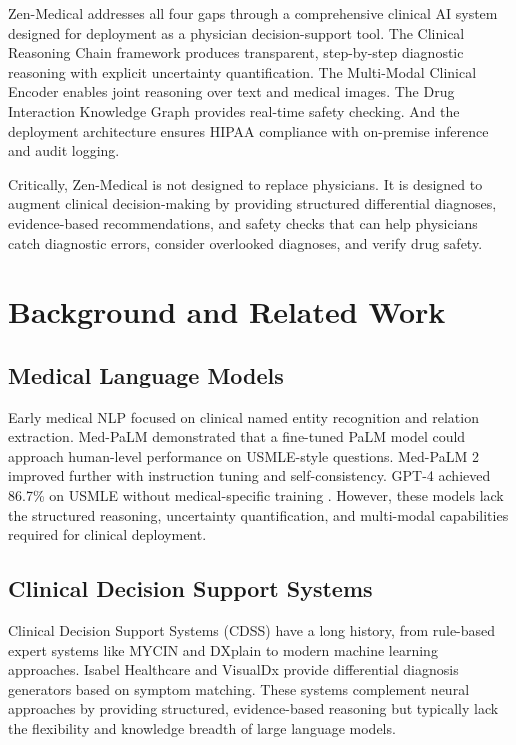 \documentclass[11pt,a4paper]{article}
\begin{document}
Zen-Medical addresses all four gaps through a comprehensive clinical AI system designed for deployment as a physician decision-support tool. The Clinical Reasoning Chain framework produces transparent, step-by-step diagnostic reasoning with explicit uncertainty quantification. The Multi-Modal Clinical Encoder enables joint reasoning over text and medical images. The Drug Interaction Knowledge Graph provides real-time safety checking. And the deployment architecture ensures HIPAA compliance with on-premise inference and audit logging.

Critically, Zen-Medical is not designed to replace physicians. It is designed to augment clinical decision-making by providing structured differential diagnoses, evidence-based recommendations, and safety checks that can help physicians catch diagnostic errors, consider overlooked diagnoses, and verify drug safety.

\section{Background and Related Work}
\label{sec:background}

\subsection{Medical Language Models}

Early medical NLP focused on clinical named entity recognition \citep{lee2020biobert} and relation extraction. Med-PaLM \citep{singhal2023large} demonstrated that a fine-tuned PaLM model could approach human-level performance on USMLE-style questions. Med-PaLM 2 \citep{singhal2023towards} improved further with instruction tuning and self-consistency. GPT-4 achieved 86.7\% on USMLE without medical-specific training \citep{nori2023capabilities}. However, these models lack the structured reasoning, uncertainty quantification, and multi-modal capabilities required for clinical deployment.

\subsection{Clinical Decision Support Systems}

Clinical Decision Support Systems (CDSS) have a long history, from rule-based expert systems like MYCIN \citep{shortliffe1975model} and DXplain \citep{barnett1987dxplain} to modern machine learning approaches. Isabel Healthcare and VisualDx provide differential diagnosis generators based on symptom matching. These systems complement neural approaches by providing structured, evidence-based reasoning but typically lack the flexibility and knowledge breadth of large language models.
\end{document}

